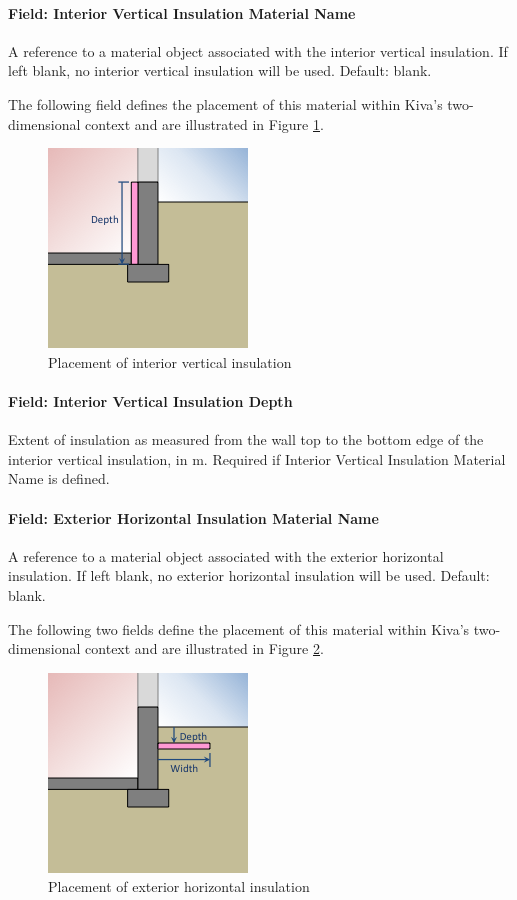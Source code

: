 \paragraph{Field: Interior Vertical Insulation Material
Name}

A reference to a material object associated with the interior vertical
insulation. If left blank, no interior vertical insulation will be used.
Default: blank.

The following field defines the placement of this material within Kiva's
two-dimensional context and are illustrated in Figure \ref{fig:ivi}.

\begin{figure}
\centering
\includegraphics{media/kiva-2d-ivi.png}
\caption{Placement of interior vertical insulation\label{fig:ivi}}
\end{figure}

\paragraph{Field: Interior Vertical Insulation
Depth}

Extent of insulation as measured from the wall top to the bottom edge of
the interior vertical insulation, in m. Required if Interior Vertical
Insulation Material Name is defined.

\paragraph{Field: Exterior Horizontal Insulation Material
Name}

A reference to a material object associated with the exterior horizontal
insulation. If left blank, no exterior horizontal insulation will be
used. Default: blank.

The following two fields define the placement of this material within
Kiva's two-dimensional context and are illustrated in Figure
\ref{fig:ehi}.

\begin{figure}
\centering
\includegraphics{media/kiva-2d-ehi.png}
\caption{Placement of exterior horizontal insulation\label{fig:ehi}}
\end{figure}


